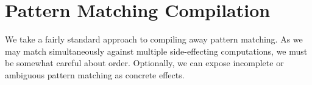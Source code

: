 \documentclass[preprint]{sigplanconf}
\newcommand{\lameff}{$\lambda_\mathrm{eff}$\xspace}
\newcommand{\feff}{$F_\textrm{eff}$\xspace}
\newcommand{\impeff}{Implicit \lameff}
\begin{document}










\section{Pattern Matching Compilation}
\label{sec:core}

We take a fairly standard approach to compiling away pattern
matching. As we may match simultaneously against multiple
side-effecting computations, we must be somewhat careful about
order. Optionally, we can expose incomplete or ambiguous pattern
matching as concrete effects.
\end{document}
